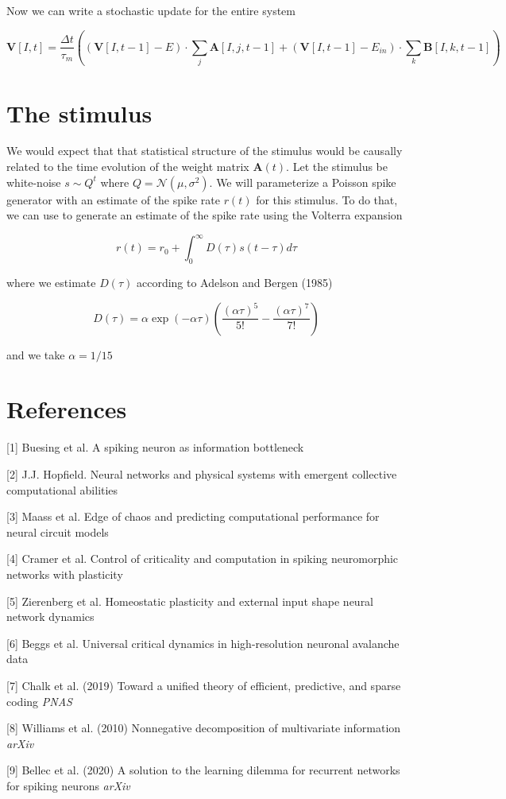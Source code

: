 \documentclass{article} %
\begin{document}
Now we can write a stochastic update for the entire system

\begin{equation*}
\mathbf{V}[I,t] = \frac{\Delta t}{\tau_{m}}\left((\mathbf{V}[I,t-1]-E)\cdot \sum_{j} \mathbf{A}[I,j,t-1] + (\mathbf{V}[I,t-1] - E_{in})\cdot \sum_{k}\mathbf{B}[I,k,t-1]\right)
\end{equation*}



\section{The stimulus}

We would expect that that statistical structure of the stimulus would be causally related to the time evolution of the weight matrix $\mathbf{A}(t)$. Let the stimulus be white-noise $s \sim Q^{t}$ where $Q =  \mathcal{N}(\mu,\sigma^{2})$. We will parameterize a Poisson spike generator with an estimate of the spike rate $r(t)$ for this stimulus. To do that, we can use to generate an estimate of the spike rate using the Volterra expansion

\begin{equation*}
r(t) = r_{0} + \int_{0}^{\infty} D(\tau)s(t-\tau)d\tau
\end{equation*}

where we estimate $D(\tau)$ according to Adelson and Bergen (1985)

\begin{equation*}
D(\tau) = \alpha\exp(-\alpha\tau)\left(\frac{(\alpha\tau)^{5}}{5!}-\frac{(\alpha\tau)^{7}}{7!}\right)
\end{equation*}

and we take $\alpha=1/15$


\section*{References}

[1] Buesing et al. A spiking neuron as information bottleneck

[2] J.J. Hopfield. Neural networks and physical systems with emergent collective computational abilities

[3] Maass et al. Edge of chaos and predicting computational performance for neural circuit models

[4] Cramer et al. Control of criticality and computation in spiking neuromorphic networks with plasticity

[5] Zierenberg et al. Homeostatic plasticity and external input shape neural network dynamics

[6] Beggs et al. Universal critical dynamics in high-resolution neuronal avalanche data

[7] Chalk et al. (2019) Toward a unified theory of efficient, predictive, and sparse coding {\it PNAS}

[8] Williams et al. (2010) Nonnegative decomposition of multivariate information {\it arXiv}

[9] Bellec et al. (2020) A solution to the learning dilemma for recurrent networks for spiking neurons {\it arXiv}
\end{document}
